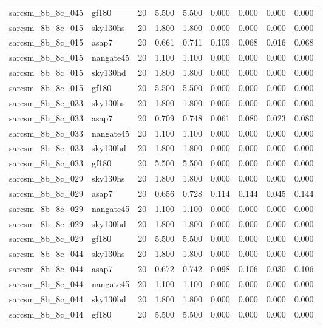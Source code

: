 \begin{tabular}{llrrrrrrr}
sarcsm\_8b\_8c\_045 & gf180 & 20 & 5.500 & 5.500 & 0.000 & 0.000 & 0.000 & 0.000 \\
sarcsm\_8b\_8c\_015 & sky130hs & 20 & 1.800 & 1.800 & 0.000 & 0.000 & 0.000 & 0.000 \\
sarcsm\_8b\_8c\_015 & asap7 & 20 & 0.661 & 0.741 & 0.109 & 0.068 & 0.016 & 0.068 \\
sarcsm\_8b\_8c\_015 & nangate45 & 20 & 1.100 & 1.100 & 0.000 & 0.000 & 0.000 & 0.000 \\
sarcsm\_8b\_8c\_015 & sky130hd & 20 & 1.800 & 1.800 & 0.000 & 0.000 & 0.000 & 0.000 \\
sarcsm\_8b\_8c\_015 & gf180 & 20 & 5.500 & 5.500 & 0.000 & 0.000 & 0.000 & 0.000 \\
sarcsm\_8b\_8c\_033 & sky130hs & 20 & 1.800 & 1.800 & 0.000 & 0.000 & 0.000 & 0.000 \\
sarcsm\_8b\_8c\_033 & asap7 & 20 & 0.709 & 0.748 & 0.061 & 0.080 & 0.023 & 0.080 \\
sarcsm\_8b\_8c\_033 & nangate45 & 20 & 1.100 & 1.100 & 0.000 & 0.000 & 0.000 & 0.000 \\
sarcsm\_8b\_8c\_033 & sky130hd & 20 & 1.800 & 1.800 & 0.000 & 0.000 & 0.000 & 0.000 \\
sarcsm\_8b\_8c\_033 & gf180 & 20 & 5.500 & 5.500 & 0.000 & 0.000 & 0.000 & 0.000 \\
sarcsm\_8b\_8c\_029 & sky130hs & 20 & 1.800 & 1.800 & 0.000 & 0.000 & 0.000 & 0.000 \\
sarcsm\_8b\_8c\_029 & asap7 & 20 & 0.656 & 0.728 & 0.114 & 0.144 & 0.045 & 0.144 \\
sarcsm\_8b\_8c\_029 & nangate45 & 20 & 1.100 & 1.100 & 0.000 & 0.000 & 0.000 & 0.000 \\
sarcsm\_8b\_8c\_029 & sky130hd & 20 & 1.800 & 1.800 & 0.000 & 0.000 & 0.000 & 0.000 \\
sarcsm\_8b\_8c\_029 & gf180 & 20 & 5.500 & 5.500 & 0.000 & 0.000 & 0.000 & 0.000 \\
sarcsm\_8b\_8c\_044 & sky130hs & 20 & 1.800 & 1.800 & 0.000 & 0.000 & 0.000 & 0.000 \\
sarcsm\_8b\_8c\_044 & asap7 & 20 & 0.672 & 0.742 & 0.098 & 0.106 & 0.030 & 0.106 \\
sarcsm\_8b\_8c\_044 & nangate45 & 20 & 1.100 & 1.100 & 0.000 & 0.000 & 0.000 & 0.000 \\
sarcsm\_8b\_8c\_044 & sky130hd & 20 & 1.800 & 1.800 & 0.000 & 0.000 & 0.000 & 0.000 \\
sarcsm\_8b\_8c\_044 & gf180 & 20 & 5.500 & 5.500 & 0.000 & 0.000 & 0.000 & 0.000 \\

\end{tabular}

